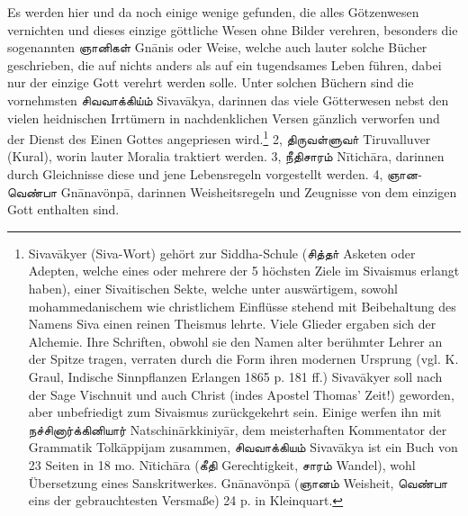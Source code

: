 \documentclass{article}
\newcommand{\TamilText}[1]{\texttamil{#1}}
\newcommand{\tam}[1]{\TamilText{#1}}
\begin{document}
Es werden hier und da noch einige wenige gefunden, die alles Götzenwesen vernichten und dieses einzige göttliche Wesen ohne Bilder verehren, besonders die sogenannten \tam{ஞானிகள்} Gn\={a}nis oder Weise, welche auch lauter solche Bücher geschrieben, die auf nichts anders als auf ein tugendsames Leben führen, dabei nur der einzige Gott verehrt werden solle. Unter solchen Büchern sind die vornehmsten \tam{சிவவாக்கிய்ம்} Sivav\={a}kya, darinnen das viele Götterwesen nebst den vielen heidnischen Irrtümern in nachdenklichen Versen gänzlich verworfen und der Dienst des Einen Gottes angepriesen wird.\footnote{Sivav\={a}kyer (Siva-Wort) gehört zur Siddha-Schule (\tam{சித்தா்} Asketen oder Adepten, welche eines oder mehrere der 5 höchsten Ziele im Sivaismus erlangt haben), einer Sivaitischen Sekte, welche unter auswärtigem, sowohl mohammedanischem wie christlichem Einflüsse stehend mit Beibehaltung des Namens Siva einen reinen Theismus lehrte. Viele Glieder ergaben sich der Alchemie. Ihre Schriften, obwohl sie den Namen alter berühmter Lehrer an der Spitze tragen, verraten durch die Form ihren modernen Ursprung (vgl. K. Graul, Indische Sinnpflanzen Erlangen 1865 p. 181 ff.) Sivav\={a}kyer soll nach der Sage Vischnuit und auch Christ (indes Apostel Thomas' Zeit!) geworden, aber unbefriedigt zum Sivaismus zurückgekehrt sein. Einige werfen ihn mit \tam{நச்சினார்க்கினியார்} Natschin\={a}rkkiniy\={a}r, dem meisterhaften Kommentator der Grammatik Tolk\={a}ppijam zusammen, \tam{சிவவாக்கியம்} Sivav\={a}kya ist ein Buch von 23 Seiten in 18 mo. N\={i}tich\={a}ra (\tam{கீதி} Gerechtigkeit, \tam{சாரம்} Wandel), wohl Übersetzung eines Sanskritwerkes. Gn\={a}navönp\={a} (\tam{ஞானம்} Weisheit, \tam{வெண்பா} eins der gebrauchtesten Versmaße) 24 p. in Kleinquart.} 2, \tam{திருவள்ளுவா்} Tiruvalluver (Kural), worin lauter Moralia traktiert werden. 3, \tam{நீதிசாரம்} N\={i}tich\={a}ra, darinnen durch Gleichnisse diese und jene Lebensregeln vorgestellt werden. 4, \tam{ஞானவெண்பா} Gn\={a}navönp\={a}, darinnen Weisheitsregeln und Zeugnisse von dem einzigen Gott enthalten sind.
\end{document}
